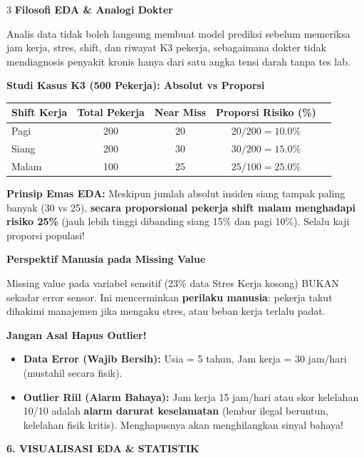 \documentclass[6.8pt,landscape,a4paper]{extarticle}
\newcommand{\sdtSection}[2][sdtNavy]{%
    \vspace{0.6pt}%
    \noindent\colorbox{#1}{%
        \parbox{\dimexpr\linewidth-2\fboxsep\relax}{%
            \textbf{\fontsize{6.5pt}{7.5pt}\selectfont\color{white}#2}%
        }%
    }\vspace{0.3pt}%
}
\newcommand{\sdtSub}[1]{%
    \vspace{0.5pt}%
    \noindent\textbf{\fontsize{5.8pt}{6.8pt}\selectfont\color{sdtBlue}#1}\vspace{0.1pt}%
}
\newcommand{\alertBox}[2][sdtRed]{%
    \begin{tcolorbox}[
        enhanced, frame hidden,
        borderline west={1.2pt}{0pt}{#1},
        colback=#1!5,
        top=0.2mm, bottom=0.2mm, left=0.8mm, right=0.5mm,
        before skip=0.25mm, after skip=0.25mm
    ]
        {\fontsize{5.2pt}{6.2pt}\selectfont#2}
    \end{tcolorbox}
}
\begin{document}
\begin{multicols}{3}
\sdtSub{Filosofi EDA \& Analogi Dokter}
Analis data tidak boleh langsung membuat model prediksi sebelum memeriksa jam kerja, stres, shift, dan riwayat K3 pekerja, sebagaimana dokter tidak mendiagnosis penyakit kronis hanya dari satu angka tensi darah tanpa tes lab.

\sdtSub{Studi Kasus K3 (500 Pekerja): Absolut vs Proporsi}
\begin{center}
{\fontsize{5.2pt}{6.2pt}\selectfont
\begin{tabular}{@{}lcccc@{}}
\toprule
\textbf{Shift Kerja} & \textbf{Total Pekerja} & \textbf{Near Miss} & \textbf{Proporsi Risiko (\%)} \\
\midrule
Pagi & 200 & 20 & $20/200 = \mathbf{10.0\%}$ \\
Siang & 200 & 30 & $30/200 = \mathbf{15.0\%}$ \\
Malam & 100 & 25 & $25/100 = \mathbf{25.0\%}$ \\
\bottomrule
\end{tabular}}
\end{center}
\alertBox[sdtRed]{
\textbf{Prinsip Emas EDA:}
Meskipun jumlah absolut insiden siang tampak paling banyak (30 vs 25), \textbf{secara proporsional pekerja shift malam menghadapi risiko 25\%} (jauh lebih tinggi dibanding siang 15\% dan pagi 10\%). Selalu kaji proporsi populasi!
}

\sdtSub{Perspektif Manusia pada Missing Value}
Missing value pada variabel sensitif (23\% data Stres Kerja kosong) BUKAN sekadar error sensor. Ini mencerminkan \textbf{perilaku manusia}: pekerja takut dihakimi manajemen jika mengaku stres, atau beban kerja terlalu padat.

\sdtSub{Jangan Asal Hapus Outlier!}
\begin{itemize}
    \item \textbf{Data Error (Wajib Bersih):} Usia = 5 tahun, Jam kerja = 30 jam/hari (mustahil secara fisik).
    \item \textbf{Outlier Riil (Alarm Bahaya):} Jam kerja 15 jam/hari atau skor kelelahan 10/10 adalah \textbf{alarm darurat keselamatan} (lembur ilegal beruntun, kelelahan fisik kritis). Menghapusnya akan menghilangkan sinyal bahaya!
\end{itemize}



\sdtSection{6. VISUALISASI EDA \& STATISTIK}


\end{multicols}
\end{document}
